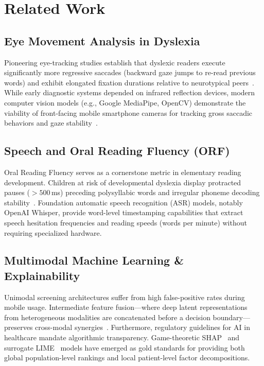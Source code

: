 \documentclass[conference]{IEEEtran}
\begin{document}
\section{Related Work}
\subsection{Eye Movement Analysis in Dyslexia}
Pioneering eye-tracking studies establish that dyslexic readers execute significantly more regressive saccades (backward gaze jumps to re-read previous words) and exhibit elongated fixation durations relative to neurotypical peers~\cite{rayner1998}. While early diagnostic systems depended on infrared reflection devices, modern computer vision models (e.g., Google MediaPipe, OpenCV) demonstrate the viability of front-facing mobile smartphone cameras for tracking gross saccadic behaviors and gaze stability~\cite{lugaresi2019}.

\subsection{Speech and Oral Reading Fluency (ORF)}
Oral Reading Fluency serves as a cornerstone metric in elementary reading development. Children at risk of developmental dyslexia display protracted pauses ($>500$\,ms) preceding polysyllabic words and irregular phoneme decoding stability~\cite{radford2023}. Foundation automatic speech recognition (ASR) models, notably OpenAI Whisper, provide word-level timestamping capabilities that extract speech hesitation frequencies and reading speeds (words per minute) without requiring specialized hardware.

\subsection{Multimodal Machine Learning \& Explainability}
Unimodal screening architectures suffer from high false-positive rates during mobile usage. Intermediate feature fusion---where deep latent representations from heterogeneous modalities are concatenated before a decision boundary---preserves cross-modal synergies~\cite{baltrusaitis2018}. Furthermore, regulatory guidelines for AI in healthcare mandate algorithmic transparency. Game-theoretic SHAP~\cite{lundberg2017} and surrogate LIME~\cite{ribeiro2016} models have emerged as gold standards for providing both global population-level rankings and local patient-level factor decompositions.
\end{document}
